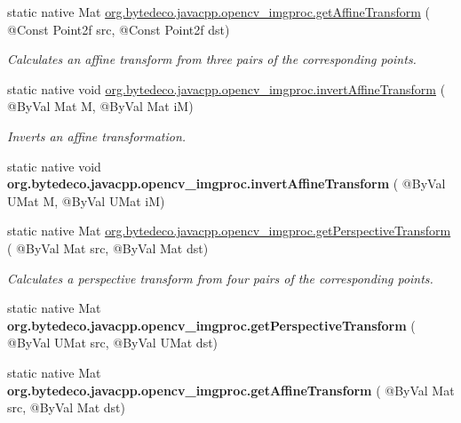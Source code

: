 \begin{DoxyCompactItemize}
static native Mat \hyperlink{group__imgproc__transform_ga6aff4eb184828799fb795a52309aa8e6}{org.\+bytedeco.\+javacpp.\+opencv\+\_\+imgproc.\+get\+Affine\+Transform} ( @Const Point2f src, @Const Point2f dst)
\begin{DoxyCompactList}\small\item\em Calculates an affine transform from three pairs of the corresponding points. \end{DoxyCompactList}\item 
static native void \hyperlink{group__imgproc__transform_ga4905a785b488db4f1dbb485efa98356c}{org.\+bytedeco.\+javacpp.\+opencv\+\_\+imgproc.\+invert\+Affine\+Transform} ( @By\+Val Mat M, @By\+Val Mat iM)
\begin{DoxyCompactList}\small\item\em Inverts an affine transformation. \end{DoxyCompactList}\item 
\mbox{\label{group__imgproc__transform_gad6e485924dd64cc649424d787d8fab29}} 
static native void {\bfseries org.\+bytedeco.\+javacpp.\+opencv\+\_\+imgproc.\+invert\+Affine\+Transform} ( @By\+Val U\+Mat M, @By\+Val U\+Mat iM)
\item 
static native Mat \hyperlink{group__imgproc__transform_gaf64ca469bb365e0b906e40ecde6eefe5}{org.\+bytedeco.\+javacpp.\+opencv\+\_\+imgproc.\+get\+Perspective\+Transform} ( @By\+Val Mat src, @By\+Val Mat dst)
\begin{DoxyCompactList}\small\item\em Calculates a perspective transform from four pairs of the corresponding points. \end{DoxyCompactList}\item 
\mbox{\label{group__imgproc__transform_gacef8fadffa20fc154ff81e2e7fe40d67}} 
static native Mat {\bfseries org.\+bytedeco.\+javacpp.\+opencv\+\_\+imgproc.\+get\+Perspective\+Transform} ( @By\+Val U\+Mat src, @By\+Val U\+Mat dst)
\item 
\mbox{\label{group__imgproc__transform_gaf9fc15e742da3e7e69078fc070877489}} 
static native Mat {\bfseries org.\+bytedeco.\+javacpp.\+opencv\+\_\+imgproc.\+get\+Affine\+Transform} ( @By\+Val Mat src, @By\+Val Mat dst)
\item 
\mbox{\label{group__imgproc__transform_gaeade0f6305705ef5abd54be6250e6114}} 

\end{DoxyCompactItemize}
